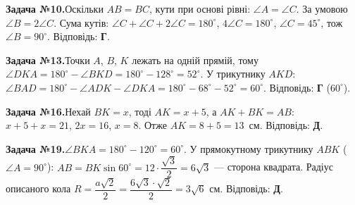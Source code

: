 \documentclass[12pt]{article}
\begin{document}
\par\vspace{0.3cm}\noindent\hypertarget{sol:10}{}
\begin{tcolorbox}[colback=titleBg!40, colframe=mainGreen!55, boxrule=0.4pt, arc=2pt, left=6pt, right=6pt, top=4pt, bottom=4pt, breakable]
\noindent\small\textbf{Задача №10.}\quad Оскільки $AB=BC$, кути при основі рівні: $\angle A=\angle C$. За умовою $\angle B=2\angle C$. Сума кутів: $\angle C+\angle C+2\angle C=180^\circ$, $4\angle C=180^\circ$, $\angle C=45^\circ$, тож $\angle B=90^\circ$. Відповідь: \textbf{Г}.
\par\vspace{0.1cm}\hfill\hyperlink{task:10}{}
\end{tcolorbox}
\par\vspace{0.3cm}\noindent\hypertarget{sol:13}{}
\begin{tcolorbox}[colback=titleBg!40, colframe=mainGreen!55, boxrule=0.4pt, arc=2pt, left=6pt, right=6pt, top=4pt, bottom=4pt, breakable]
\noindent\small\textbf{Задача №13.}\quad Точки $A$, $B$, $K$ лежать на одній прямій, тому $\angle DKA = 180^\circ - \angle BKD = 180^\circ - 128^\circ = 52^\circ$. У трикутнику $AKD$: $\angle BAD = 180^\circ - \angle ADK - \angle DKA = 180^\circ - 68^\circ - 52^\circ = 60^\circ$. Відповідь: \textbf{Г} ($60^\circ$).
\par\vspace{0.1cm}\hfill\hyperlink{task:13}{}
\end{tcolorbox}
\par\vspace{0.3cm}\noindent\hypertarget{sol:16}{}
\begin{tcolorbox}[colback=titleBg!40, colframe=mainGreen!55, boxrule=0.4pt, arc=2pt, left=6pt, right=6pt, top=4pt, bottom=4pt, breakable]
\noindent\small\textbf{Задача №16.}\quad Нехай $BK=x$, тоді $AK=x+5$, а $AK+BK=AB$: $x+5+x=21$, $2x=16$, $x=8$. Отже $AK=8+5=13$~см. Відповідь: \textbf{Д}.
\par\vspace{0.1cm}\hfill\hyperlink{task:16}{}
\end{tcolorbox}
\par\vspace{0.3cm}\noindent\hypertarget{sol:19}{}
\begin{tcolorbox}[colback=titleBg!40, colframe=mainGreen!55, boxrule=0.4pt, arc=2pt, left=6pt, right=6pt, top=4pt, bottom=4pt, breakable]
\noindent\small\textbf{Задача №19.}\quad $\angle BKA=180^\circ-120^\circ=60^\circ$. У прямокутному трикутнику $ABK$ ($\angle A=90^\circ$): $AB=BK\sin 60^\circ=12\cdot\dfrac{\sqrt3}{2}=6\sqrt3$ --- сторона квадрата. Радіус описаного кола $R=\dfrac{a\sqrt2}{2}=\dfrac{6\sqrt3\cdot\sqrt2}{2}=3\sqrt6$ см. Відповідь: \textbf{Д}.
\par\vspace{0.1cm}\hfill\hyperlink{task:19}{}
\end{tcolorbox}
\end{document}
